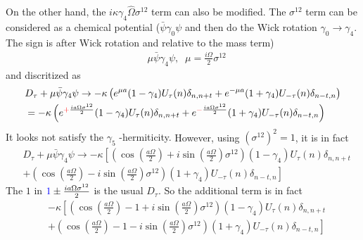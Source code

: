 On the other hand, the $i\kappa \gamma _4 \hat{\Omega} \sigma ^{12}$ term can also be modified. The $\sigma ^{12}$ term can be considered as a chemical potential ($\bar{\psi}\gamma _0 \psi$ and then do the Wick rotation $\gamma _0\to \gamma _4$. The sign is after Wick rotation and relative to the mass term)
\begin{equation}
\begin{split}
&\mu  \bar{\psi} \gamma _4 \psi,\;\;\mu = \frac{i\Omega}{2}\sigma ^{12}
\end{split}
\end{equation}
and discritized as
\begin{equation}
\begin{split}
&D_{\tau}+\mu  \bar{\psi} \gamma _4 \psi \to -\kappa \left(e^{\mu a}(1-\gamma _4)U_{\tau}(n)\delta _{n,n+t} + e^{-\mu a}(1+\gamma _4) U_{-\tau}(n)\delta _{n-t,n}\right)\\
&=-\kappa \left(e^{\textcolor[rgb]{1,0,0}{+}\frac{ia\Omega \sigma ^{12}}{2}}(1-\gamma _4)U_{\tau}(n)\delta _{n,n+t} + e^{\textcolor[rgb]{1,0,0}{-}\frac{ia\Omega \sigma ^{12}}{2}}(1+\gamma _4) U_{-\tau}(n)\delta _{n-t,n}\right)
\end{split}
\end{equation}
\textcolor[rgb]{1,0,0}{It looks not satisfy the $\gamma _5$ -hermiticity.} However, using $\left(\sigma ^{12}\right)^2=1$, it is in fact
\begin{equation}
\begin{split}
&D_{\tau}+\mu  \bar{\psi} \gamma _4 \psi \to -\kappa \left[\left(\cos(\frac{a\Omega}{2})+i\sin(\frac{a\Omega}{2})\sigma ^{12}\right)(1-\gamma _4)U_{\tau}(n)\delta _{n,n+t} \right.\\
&\left.+\left(\cos(\frac{a\Omega}{2})-i\sin(\frac{a\Omega}{2})\sigma ^{12}\right)(1+\gamma _4) U_{-\tau}(n)\delta _{n-t,n}\right]
\end{split}
\end{equation}
The $1$ in $\textcolor[rgb]{0,0,1}{1}\pm \frac{ia\Omega \sigma ^{12}}{2}$ is the usual $D_{\tau}$. So the additional term is in fact
\textcolor[rgb]{0,0,1}{
\begin{equation}
\begin{split}
&-\kappa \left[\left(\cos(\frac{a\Omega}{2})-1+i\sin(\frac{a\Omega}{2})\sigma ^{12}\right)(1-\gamma _4)U_{\tau}(n)\delta _{n,n+t} \right.\\
&\left.+\left(\cos(\frac{a\Omega}{2})-1-i\sin(\frac{a\Omega}{2})\sigma ^{12}\right)(1+\gamma _4) U_{-\tau}(n)\delta _{n-t,n}\right]
\end{split}
\end{equation}
}

